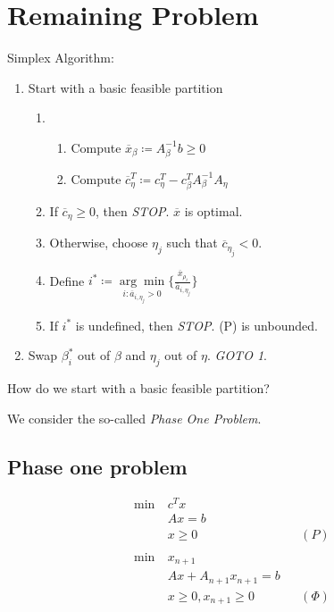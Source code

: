 \section{Remaining Problem}
\begin{prev}
	Simplex Algorithm:
	\begin{enumerate}
		\item Start with a basic feasible partition
		      \begin{enumerate}
			      \item \begin{enumerate}
				            \item Compute \(\overline{x}_{\beta} \coloneqq A^{-1}_{\beta} b \geq 0\)
				            \item Compute \(\overline{c}_{\eta}^{T} \coloneqq c_{\eta}^{T} - c_{\beta}^{T} A^{-1}_{\beta} A_{\eta}\)
			            \end{enumerate}
			      \item If \(\overline{c}_{\eta} \geq 0\), then \emph{STOP}. \(\overline{x}\) is optimal.
			      \item Otherwise, choose \(\eta_j\) such that \(\overline{c}_{\eta_j} < 0\).
			      \item Define \(i^{*}\coloneqq \underset{i:\overline{a}_{i, \eta_j}>0}{\arg\min} \{\frac{\overline{x}_{\rho_i}}{\overline{a}_{i, \eta_j}}\} \)
			      \item If \(i^{*}\) is undefined, then \emph{STOP}. (P) is unbounded.
		      \end{enumerate}
		\item Swap \(\beta_i^{*}\) out of \(\beta \) and \(\eta_j\) out of \(\eta \). \emph{GOTO 1}.
	\end{enumerate}
\end{prev}

\begin{problem}
How do we start with a basic feasible partition?
\end{problem}

\begin{answer}
	We consider the so-called \emph{Phase One Problem}.
\end{answer}
\subsection{Phase one problem}
\begin{align*}
	\min~ & c^T x                                \\
	      & Ax = b                               \\
	      & x\geq 0                  &  & (P)    \\\\
	\min~ & x_{n+1}                              \\
	      & Ax + A_{n+1}x_{n+1} = b              \\
	      & x\geq 0, x_{n+1} \geq  0 &  & (\Phi)
\end{align*}

